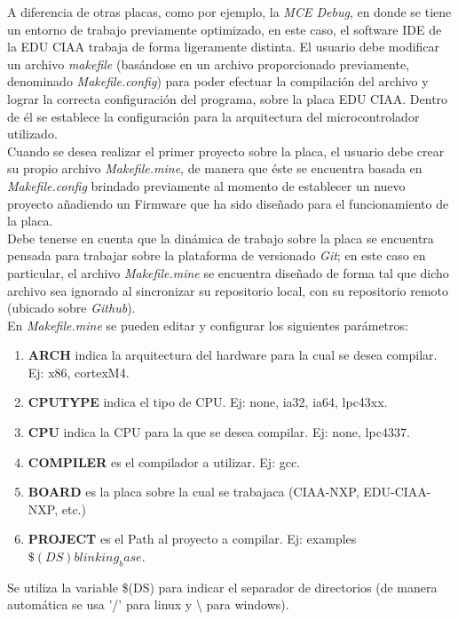 \documentclass[12pt,letterpaper]{article}
\begin{document}
A diferencia de otras placas, como por ejemplo, la \textit{MCE Debug}, en donde se tiene un entorno de trabajo previamente optimizado, en este caso, el software IDE de la EDU CIAA trabaja de forma ligeramente distinta. El usuario debe modificar un archivo \textit{makefile} (basándose en un archivo proporcionado previamente, denominado \textit{Makefile.config}) para poder efectuar la compilación del archivo y lograr la correcta configuración del programa, sobre la placa EDU CIAA. Dentro de él se establece la configuración para la arquitectura del microcontrolador utilizado.
 \\
 
Cuando se desea realizar el primer proyecto sobre la placa, el usuario debe crear su propio archivo \textit{Makefile.mine}, de manera que éste se encuentra basada en \textit{Makefile.config} brindado previamente al momento de establecer un nuevo proyecto añadiendo un Firmware que ha sido diseñado para el funcionamiento de la placa.
 \\
 
Debe tenerse en cuenta que la dinámica de trabajo sobre la placa se encuentra pensada para trabajar sobre la plataforma de versionado \textit{Git}; en este caso en particular, el archivo \textit{Makefile.mine} se encuentra diseñado de forma tal que dicho archivo sea ignorado al sincronizar su repositorio local, con su repositorio remoto (ubicado sobre \textit{Github}).
 \\
 
En \textit{Makefile.mine} se pueden editar y configurar los siguientes parámetros\cite{parametrosdelmakefile}:
\begin{enumerate}
\item \textbf{ARCH}  indica la arquitectura del hardware para la cual se desea compilar. Ej: x86, cortexM4.
\item \textbf{CPUTYPE} indica el tipo de CPU. Ej: none, ia32, ia64, lpc43xx.
\item \textbf{CPU} indica la CPU para la que se desea compilar. Ej: none, lpc4337.
\item \textbf{COMPILER }es el compilador a utilizar. Ej: gcc.
\item \textbf{BOARD }es la placa sobre la cual se trabajaca (CIAA-NXP, EDU-CIAA-NXP, etc.)
\item \textbf{PROJECT }es el Path al proyecto a compilar. Ej: examples$\$(DS)blinking_base$.
\end{enumerate}
Se utiliza la variable \$(DS) para indicar el separador de directorios (de manera automática se usa '/' para linux y \textbackslash{} para windows).
 \\
 
\end{document}
